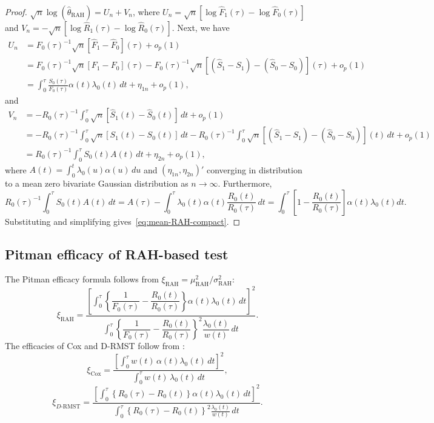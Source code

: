 \documentclass[12pt]{article}
\newcommand{\RAH}{\mathrm{RAH}}
\newcommand{\DRMST}{D\text{-}\mathrm{RMST}}
\newcommand{\dd}{\,d}
\begin{document}
\begin{proof}
 $\sqrt{n}\log(\hat\theta_{\RAH})=U_n+V_n$,
where $U_n=\sqrt{n}[\log\hat F_1(\tau)-\log\hat F_0(\tau)]$
and $V_n=-\sqrt{n}[\log\hat R_1(\tau)-\log\hat R_0(\tau)]$.
Next, we have
\begin{align*}
  U_n &= F_0(\tau)^{-1}\sqrt{n}[\hat F_1-\hat F_0](\tau)+o_p(1)\\
      &=F_0(\tau)^{-1}\sqrt{n}[F_1-F_0](\tau)-F_0(\tau)^{-1}\sqrt{n}[(\hat S_1- S_1)-(\hat S_0-S_0)](\tau)+o_p(1)\\
      &=\int_0^\tau\frac{S_0(\tau)}{F_0(\tau)}\alpha(t)\lambda_0(t)\dd t+\eta_{1n}+o_p(1),
\end{align*}
and
\begin{align*}
V_n &= -R_0(\tau)^{-1}\int_0^\tau\sqrt{n}[\hat S_1(t)-\hat S_0(t)]\dd t +o_p(1)\\
    &= -R_0(\tau)^{-1}\int_0^\tau\sqrt{n}[S_1(t)-S_0(t)]\dd t -R_0(\tau)^{-1}\int_0^\tau\sqrt{n}\left[(\hat{S}_1-S_1)-(\hat{S}_0-S_0)\right](t)\dd t+o_p(1)\\
    &=R_0(\tau)^{-1}\int_0^\tau S_0(t)A(t)\dd t+\eta_{2n}+o_p(1),
\end{align*}
where $A(t)=\int_0^t\lambda_0(u)\alpha(u)\dd u$ and $(\eta_{1n}, \eta_{2n})'$ converging in distribution to a mean zero bivariate Gaussian distribution as $n\to \infty.$  Furthermore,
\[R_0(\tau)^{-1}\int_0^\tau S_0(t) A(t)\dd t=A(\tau)-\int_0^\tau\lambda_0(t)\alpha(t) \frac{R_0(t)}{R_0(\tau)}\dd t=\int_0^\tau \left[1-\frac{R_0(t)}{R_0(\tau)}\right]\alpha(t)\lambda_0(t)dt.\]
Substituting and simplifying gives~\eqref{eq:mean-RAH-compact}.
\end{proof}

\subsection{Pitman efficacy of RAH-based test}
\label{sec:appendix-pitman}
The Pitman efficacy formula follows from $\xi_{\RAH}=\mu_{\RAH}^2/\sigma_{\RAH}^2$:
\begin{equation}\label{eq:eff-RAH}
  \xi_{\RAH}
    =\frac{\displaystyle
      \left[\int_0^\tau\!\left\{\dfrac{1}{F_0(\tau)}-\dfrac{R_0(t)}{R_0(\tau)}\right\}
            \alpha(t)\lambda_0(t)\dd t\right]^{\!2}}{
      \displaystyle
      \int_0^\tau\!\left\{\dfrac{1}{F_0(\tau)}-\dfrac{R_0(t)}{R_0(\tau)}\right\}^{\!2}
      \dfrac{\lambda_0(t)}{w(t)}\dd t}.
\end{equation}
The efficacies of Cox and D-RMST follow from \citet{Tian2018}:
\begin{equation}\label{eq:eff-Cox}
  \xi_{\mathrm{Cox}}
    =\frac{\displaystyle
       \left[\int_0^{\tau} w(t)\,\alpha(t)\lambda_0(t)\dd t\right]^2}{
      \displaystyle
       \int_0^{\tau} w(t)\,\lambda_0(t)\dd t},
\end{equation}
\begin{equation}\label{eq:eff-DRMST}
  \xi_{\DRMST}
    =\frac{\displaystyle
       \left[\int_0^{\tau}\!\left\{R_0(\tau)-R_0(t)\right\}
             \alpha(t)\lambda_0(t)\dd t\right]^2}{
      \displaystyle
       \int_0^{\tau}\!\left\{R_0(\tau)-R_0(t)\right\}^{\!2}
       \frac{\lambda_0(t)}{w(t)}\dd t}.
\end{equation}
\end{document}
